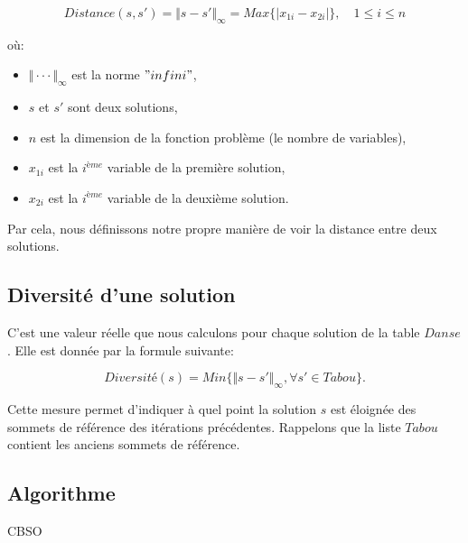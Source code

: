 \vspace{0.25em}

$$
Distance(s,s')=\Vert s-s'\Vert_\infty=Max\{\vert x_{1i}-x_{2i} \vert\}, \quad 1\leq i \leq n
$$

\vspace{2em}

où:
\begin{itemize}
	\item $\Vert \cdot \cdot \cdot \Vert_\infty$ est la norme $"infini"$,
	\item $s$ et $s'$ sont deux solutions,
	\item $n$ est la dimension de la fonction problème (le nombre de variables),
	\item $x_{1i}$ est la $i^{ème}$ variable de la première solution,
	\item $x_{2i}$ est la $i^{ème}$ variable de la deuxième solution.\\
\end{itemize}

Par cela, nous définissons notre propre manière de voir la distance entre deux solutions.

\subsection{Diversité d'une solution}

C'est une valeur réelle que nous calculons pour chaque solution de la table $Danse$. Elle est donnée par la formule suivante:

\vspace{-1em}

$$
Diversité(s)= Min\{\Vert s-s' \Vert_\infty , \forall s' \in Tabou\}.
$$


Cette mesure permet d'indiquer à quel point la solution $s$ est éloignée des sommets de référence des itérations précédentes. Rappelons que la liste $Tabou$ contient les anciens sommets de référence.

\vspace{-1em}

\subsection{Algorithme}

\begin{algorithm}[H]
	\caption{CBSO}
\end{algorithm}


